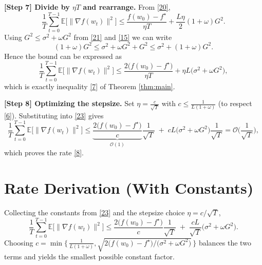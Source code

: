 \documentclass{article}
\begin{document}
\noindent\textbf{[Step 7] Divide by $\eta T$ and rearrange.}  
From \eqref{20},
\[
\frac{1}{T}\sum_{t=0}^{T-1}\mathbb{E}\big[\|\nabla f(w_{t})\|^{2}\big]
\le
\frac{f(w_{0})-f^{\star}}{\eta T}
+\frac{L\eta}{2}(1+\omega)G^{2}.
\tag{22}
\]
Using $G^{2}\le \sigma^{2}+\omega G^{2}$ from \eqref{21} and \eqref{15} we can write
\[
(1+\omega)G^{2}\le \sigma^{2}+ \omega G^{2}+G^{2}
\le \sigma^{2}+ (1+\omega)G^{2}.
\]
Hence the bound can be expressed as
\[
\frac{1}{T}\sum_{t=0}^{T-1}\mathbb{E}\big[\|\nabla f(w_{t})\|^{2}\big]
\le
\frac{2\big(f(w_{0})-f^{\star}\big)}{\eta T}
+\eta L\big(\sigma^{2}+ \omega G^{2}\big),
\tag{23}
\]
which is exactly inequality \eqref{7} of Theorem \ref{thm:main}.

\noindent\textbf{[Step 8] Optimizing the stepsize.}  
Set $\eta = \frac{c}{\sqrt{T}}$ with $c\le \frac{1}{L(1+\omega)}$ (to respect \eqref{6}). Substituting into \eqref{23} gives
\[
\frac{1}{T}\sum_{t=0}^{T-1}\mathbb{E}\big[\|\nabla f(w_{t})\|^{2}\big]
\le
\underbrace{\frac{2\big(f(w_{0})-f^{\star}\big)}{c}}_{\mathcal{O}(1)}
\frac{1}{\sqrt{T}}
\;+\;
cL\big(\sigma^{2}+ \omega G^{2}\big)\frac{1}{\sqrt{T}}
= \mathcal{O}\!\Big(\frac{1}{\sqrt{T}}\Big),
\tag{24}
\]
which proves the rate \eqref{8}.

\section*{Rate Derivation (With Constants)}
Collecting the constants from \eqref{23} and the stepsize choice $\eta=c/\sqrt{T}$,
\[
\boxed{
\frac{1}{T}\sum_{t=0}^{T-1}\mathbb{E}\big[\|\nabla f(w_{t})\|^{2}\big]
\le
\frac{2\big(f(w_{0})-f^{\star}\big)}{c}\frac{1}{\sqrt{T}}
\;+\;
\frac{cL}{\sqrt{T}}\big(\sigma^{2}+ \omega G^{2}\big)
}.
\tag{25}
\]
Choosing $c=\min\big\{\,\frac{1}{L(1+\omega)},\sqrt{2\big(f(w_{0})-f^{\star}\big)/\big(\sigma^{2}+ \omega G^{2}\big)}\,\big\}$ balances the two terms and yields the smallest possible constant factor.
\end{document}
